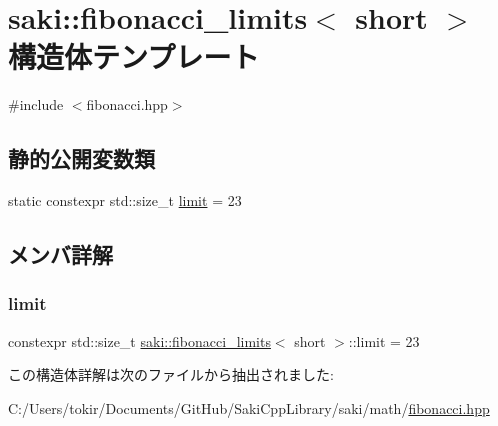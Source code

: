 \hypertarget{structsaki_1_1fibonacci__limits_3_01short_01_4}{}\section{saki\+:\+:fibonacci\+\_\+limits$<$ short $>$ 構造体テンプレート}
\label{structsaki_1_1fibonacci__limits_3_01short_01_4}


{\ttfamily \#include $<$fibonacci.\+hpp$>$}

\subsection*{静的公開変数類}
\begin{DoxyCompactItemize}
\item 
static constexpr std\+::size\+\_\+t \mbox{\hyperlink{structsaki_1_1fibonacci__limits_3_01short_01_4_ad8e9c1a0cff30682c4e75e9b5490b7b6}{limit}} = 23
\end{DoxyCompactItemize}


\subsection{メンバ詳解}
\mbox{\label{structsaki_1_1fibonacci__limits_3_01short_01_4_ad8e9c1a0cff30682c4e75e9b5490b7b6}} 
\subsubsection{\texorpdfstring{limit}{limit}}
{\footnotesize\ttfamily constexpr std\+::size\+\_\+t \mbox{\hyperlink{structsaki_1_1fibonacci__limits}{saki\+::fibonacci\+\_\+limits}}$<$ short $>$\+::limit = 23\hspace{0.3cm}{\ttfamily [static]}}



この構造体詳解は次のファイルから抽出されました\+:\begin{DoxyCompactItemize}
\item 
C\+:/\+Users/tokir/\+Documents/\+Git\+Hub/\+Saki\+Cpp\+Library/saki/math/\mbox{\hyperlink{fibonacci_8hpp}{fibonacci.\+hpp}}\end{DoxyCompactItemize}
